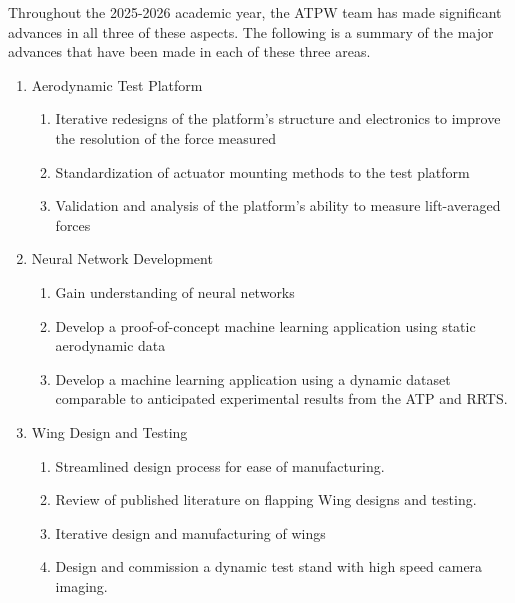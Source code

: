 Throughout the 2025-2026 academic year, the ATPW team has made significant advances in all three of these aspects. The following is a summary of the major advances that have been made in each of these three areas.
\begin{enumerate}
    \item Aerodynamic Test Platform
    \begin{enumerate}
        \item Iterative redesigns of the platform's structure and electronics to improve the resolution of the force measured
        \item Standardization of actuator mounting methods to the test platform
        \item Validation and analysis of the platform's ability to measure lift-averaged forces
    \end{enumerate}
    \item Neural Network Development
    \begin{enumerate}
        \item Gain understanding of neural networks
        \item Develop a proof-of-concept machine learning application using static aerodynamic data
        \item Develop a machine learning application using a dynamic dataset comparable to anticipated experimental results from the ATP and RRTS.
    \end{enumerate}
    \item Wing Design and Testing 
    \begin{enumerate}
        \item Streamlined design process for ease of manufacturing.
        \item Review of published literature on flapping Wing designs and testing.
        \item Iterative design and manufacturing of wings
        \item Design and commission a dynamic test stand with high speed camera imaging.
    \end{enumerate}
\end{enumerate}

